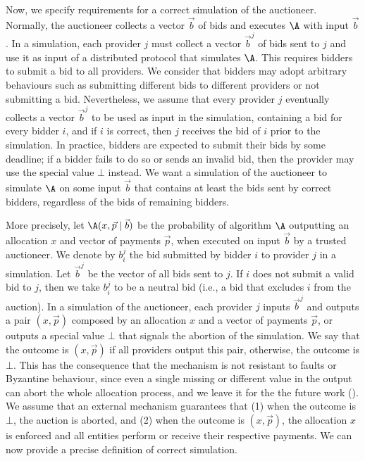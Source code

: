 Now, we specify requirements for a correct simulation of the auctioneer.
Normally, the auctioneer collects a vector $\vec{b}$
of bids and executes $\A$ with input $\vec{b}$.
In a simulation, each provider $j$ must collect a vector $\vec{b}^j$
of bids sent to $j$ and use it as input of a distributed protocol
that simulates $\A$. This requires bidders to submit a bid
to all providers. We consider that bidders may adopt arbitrary behaviours
such as submitting different bids to different providers or not submitting a bid.
Nevertheless, we assume that every provider $j$
eventually collects a vector $\vec{b}^j$ to be used as input in the simulation,
containing a bid for every bidder $i$, and if $i$ is correct,
then $j$ receives the bid of $i$ prior to the simulation.
In practice, bidders are expected to submit their bids by some deadline;
if a bidder fails to do so or sends an invalid bid,
then the provider may use the special value $\bot$ instead.
We want a simulation of the auctioneer to simulate $\A$ on some 
input $\vec{b}$ that contains at least the bids sent by correct bidders,
regardless of the bids of remaining bidders.

More precisely, let $\A(x,\vec{p} \mid \vec{b})$ be the probability
of algorithm $\A$ outputting an allocation $x$ and vector of payments $\vec{p}$,
when executed on input $\vec{b}$ by a trusted auctioneer.
We denote by $b_i^j$ the bid submitted by
bidder $i$ to provider $j$ in a simulation.
Let $\vec{b}^j$ be the vector of all bids sent to $j$.
If $i$ does not submit a valid bid to $j$, then we take $b_i^j$
to be a neutral bid (i.e., a bid that excludes $i$ from the auction).
In a simulation of the auctioneer, each provider $j$ inputs $\vec{b}^j$
and outputs a pair $(x,\vec{p})$ composed by an allocation $x$
and a vector of payments $\vec{p}$, or outputs a special value $\bot$
that signals the abortion of the simulation.
We say that the outcome is $(x,\vec{p})$ if all providers output this pair,
otherwise, the outcome is $\bot$.
This has the consequence that the mechanism is not resistant to faults or Byzantine behaviour,
since even a single missing or different value in the output can abort the whole allocation process,
and we leave it for the the future work ().
We assume that an external mechanism guarantees that
(1) when the outcome is $\bot$, the auction is aborted,
and (2) when the outcome is $(x,\vec{p})$, the allocation $x$
is enforced and all entities perform or receive their respective payments.
We can now provide a precise definition of correct simulation.

